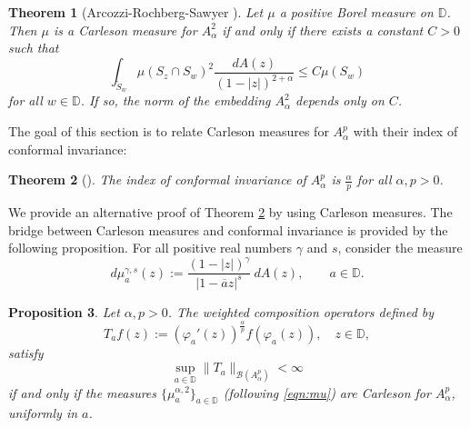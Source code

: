 \documentclass[12pt]{amsart}
\newtheorem{theorem}{Theorem}[section]
\newtheorem{proposition}[theorem]{Proposition}
\theoremstyle{definition}
\newcommand{\D}{\mathbb{{D}}}
\numberwithin{equation}{section}
\begin{document}
        \begin{theorem}[Arcozzi-Rochberg-Sawyer \cite{ARS02}]
        \label{theo:ARS}
            Let $\mu$ a positive Borel measure on $\D$. Then $\mu$ is a Carleson measure for $ A^2_\alpha$ if and only if there exists a constant $C>0$ such that
                \begin{equation}
                \label{eqn:ARS}
                    \int_{\tilde S_w}\mu(S_z\cap S_w)^2\frac{dA(z)}{(1-|z|)^{2+\alpha}}\leq C\mu(S_w)
                \end{equation}
                for all $w\in\D$. If so, the norm of the embedding $ A^2_\alpha$ depends only on $C$.
        \end{theorem}

        The goal of this section is to relate Carleson measures for $A^p_\alpha$ with their index of conformal invariance:
        
        \begin{theorem}[\cite{brevig2025contractivehardylittlewoodinequalitiesdirichlet}]
        \label{theo:confinv}
            The index of conformal invariance of $A^p_\alpha$ is $\frac{\alpha}{p}$ for all $\alpha, p>0$.
        \end{theorem}
        
        We provide an alternative proof of Theorem \ref{theo:confinv} by using Carleson measures.
        The bridge between Carleson measures and conformal invariance is provided by the following proposition. For all positive real numbers $\gamma$ and $s$, consider the measure 
            \begin{equation}\label{eqn:mu}
                d\mu^{\gamma, s}_a (z) := \frac{(1-|z|)^\gamma}{|1-\overline az|^s}~dA(z),\qquad a\in\D.
            \end{equation}
        
        \begin{proposition}
        \label{prop:conf_index_cm}
            Let $\alpha, p>0$. The weighted composition operators defined by 
            \[
                T_af(z):=\left(\varphi_a'(z)\right)^\frac{\alpha}{p}f(\varphi_a(z)), \quad z\in\D,
            \]
            satisfy
                \[
                    \sup_{a\in\D}\|T_a\|_{\mathcal{B}(A^p_\alpha)}<\infty
                \]
                if and only if the measures $\{ \mu^{\alpha, 2}_a \}_{a\in\D}$ (following \eqref{eqn:mu}) are Carleson for $A^p_{\alpha}$, uniformly in $a$.
        \end{proposition}
    
\end{document}
